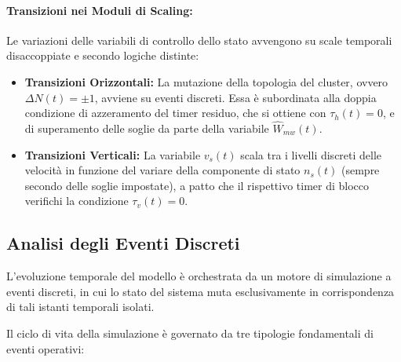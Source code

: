 ﻿\documentclass[a4paper,12pt]{article}
\begin{document}
\paragraph{Transizioni nei Moduli di Scaling:}
Le variazioni delle variabili di controllo dello stato avvengono su scale temporali disaccoppiate e secondo logiche distinte:
\begin{itemize}
    \item \textbf{Transizioni Orizzontali:} La mutazione della topologia del cluster, ovvero $\Delta N(t) = \pm 1$, avviene su eventi discreti. Essa è subordinata alla doppia condizione di azzeramento del timer residuo, che si ottiene con $\tau_h(t) = 0$, e di superamento delle soglie da parte della variabile $\hat{W}_{mw}(t)$.
    \item \textbf{Transizioni Verticali:} La variabile $v_s(t)$ scala tra i livelli discreti delle velocità in funzione del variare della componente di stato $n_s(t)$ (sempre secondo delle soglie impostate), a patto che il rispettivo timer di blocco verifichi la condizione $\tau_v(t) = 0$.
\end{itemize}


\subsection{Analisi degli Eventi Discreti}
L'evoluzione temporale del modello è orchestrata da un motore di simulazione a eventi discreti, in cui lo stato del sistema muta esclusivamente in corrispondenza di tali istanti temporali isolati.

Il ciclo di vita della simulazione è governato da tre tipologie fondamentali di eventi operativi:
\end{document}
